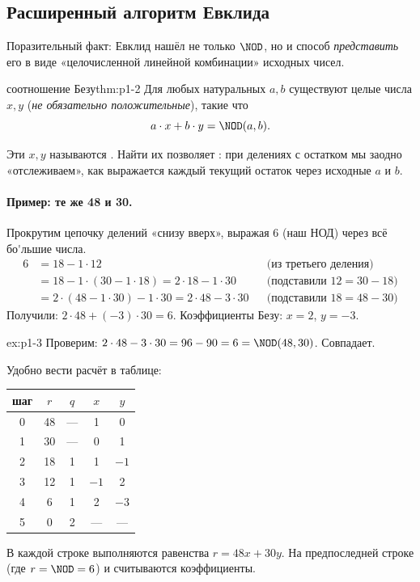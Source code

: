 \subsection{Расширенный алгоритм Евклида}

Поразительный факт: Евклид нашёл не только $\NOD$, но и способ \emph{представить} его в виде «целочисленной линейной комбинации» исходных чисел.

\begin{theorem}{соотношение Безу}{thm:p1-2}
\label{thm:bezout}
Для любых натуральных $a, b$ существуют целые числа $x, y$ (\emph{не обязательно положительные}), такие что
\[
a\cdot x + b\cdot y = \NOD(a,b).
\]
\end{theorem}

Эти $x, y$ называются . Найти их позволяет : при делениях с остатком мы заодно «отслеживаем», как выражается каждый текущий остаток через исходные $a$ и $b$.

\paragraph*{Пример: те же 48 и 30.} Прокрутим цепочку делений «снизу вверх», выражая 6 (наш НОД) через всё бо\'{}льшие числа.
\begin{align*}
6 &= 18 - 1\cdot 12 && \text{(из третьего деления)}\\
  &= 18 - 1\cdot (30 - 1\cdot 18) = 2\cdot 18 - 1\cdot 30 && \text{(подставили } 12 = 30 - 18 \text{)}\\
  &= 2\cdot (48 - 1\cdot 30) - 1\cdot 30 = 2\cdot 48 - 3\cdot 30 && \text{(подставили } 18 = 48 - 30 \text{)}
\end{align*}
Получили: $\boxed{2\cdot 48 + (-3)\cdot 30 = 6}$. Коэффициенты Безу: $x = 2$, $y = -3$.

\begin{example}{}{ex:p1-3}
Проверим: $2\cdot 48 - 3\cdot 30 = 96 - 90 = 6 = \NOD(48,30)$. Совпадает.
\end{example}

Удобно вести расчёт в таблице:
\begin{center}
\begin{tabular}{|c|c|c|c|c|}
\hline
шаг & $r$ & $q$ & $x$ & $y$ \\\hline
0 & 48 & --- & 1 & 0\\
1 & 30 & --- & 0 & 1\\
2 & 18 & 1 & 1 & $-1$\\
3 & 12 & 1 & $-1$ & 2\\
4 & 6  & 1 & 2 & $-3$\\
5 & 0  & 2 & --- & ---\\\hline
\end{tabular}
\end{center}
В каждой строке выполняются равенства $r = 48 x + 30 y$. На предпоследней строке (где $r = \NOD = 6$) и считываются коэффициенты.

